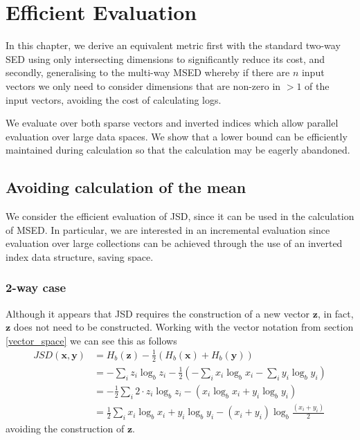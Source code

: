 \chapter{Efficient Evaluation}\label{ch:efficient_evaluation}

In this chapter, we derive an equivalent metric first with the standard two-way SED using only intersecting 
dimensions to significantly reduce its cost, and secondly, generalising to the multi-way MSED whereby if there are $n$ input vectors we only need to consider dimensions that are non-zero in $> 1$ of the input vectors, avoiding the cost of calculating logs.  

We evaluate over both sparse vectors and inverted indices which allow parallel evaluation over large data spaces.  We show that a lower bound can be efficiently maintained during calculation so that the calculation may be eagerly abandoned.
\section{Avoiding calculation of the mean}
We consider the efficient evaluation of JSD, since it can be used in the calculation of MSED.  In particular, we are interested in an incremental evaluation since evaluation over large collections can be achieved through the use of an inverted index data structure, saving space.
\subsection{2-way case}
Although it appears that JSD requires the construction of a new vector $\mathbf{z}$, in fact, $\mathbf{z}$ does not need to be constructed.  Working with the vector notation from section \ref{vector_space} we can see this as follows
\begin{align}
    JSD(\mathbf{x}, \mathbf{y}) &= H_b(\mathbf{z}) - \frac{1}{2}(H_b(\mathbf{x}) + H_b(\mathbf{y}))\\
    &= -\sum_i z_i \log_b z_i - \frac{1}{2}(-\sum_i  x_i \log_b x_i - \sum_i  y_i \log_b y_i)\\
    &= -\frac{1}{2}\sum_i 2 \cdot z_i \log_b z_i - (x_i \log_b x_i + y_i \log_b y_i)\\
    &= \frac{1}{2}\sum_i  x_i \log_b x_i + y_i \log_b y_i  - (x_i+y_i) \log_b \frac{(x_i+y_i)}{2}
\end{align}  
%
avoiding the construction of $\mathbf{z}$.


